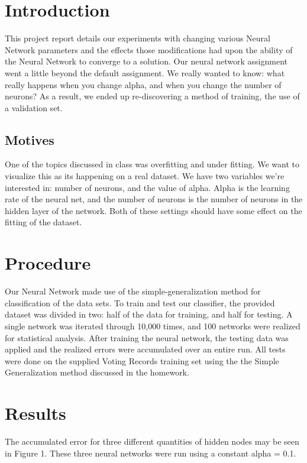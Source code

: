 \documentclass[11pt,letterpaper]{article}
\begin{document}
\maketitle

\section{Introduction}
This project report details our experiments with changing various Neural Network parameters and the effects those modifications had upon the ability of the Neural Network to converge to a solution. Our neural network assignment went a little beyond the default assignment. We really wanted to know: what really happens when you change alpha, and when you change the number of neurons? As a result, we ended up re-discovering a method of training, the use of a validation set.

\subsection{Motives} One of the topics discussed in class was overfitting and under fitting. We want to visualize this as its happening on a real dataset. We have two variables we're interested in: number of neurons, and the value of alpha. Alpha is the learning rate of the neural net, and the number of neurons is the number of neurons in the hidden layer of the network.  Both of these settings should have some effect on the fitting of the dataset.

\section{Procedure}
Our Neural Network made use of the simple-generalization method for classification of the data sets.
To train and test our classifier, the provided dataset was divided in two: half of the data for training, and half for testing.
A single network was iterated through 10,000 times, and 100 networks were realized for statistical analysis.
After training the neural network, the testing data was applied and the realized errors were accumulated over an entire run.
All tests were done on the supplied Voting Records training set using the the Simple Generalization method discussed in the homework. 

\section{Results}
The accumulated error for three different quantities of hidden nodes may be seen in Figure 1. These three neural networks were run using a constant alpha = 0.1. 
\end{document}
